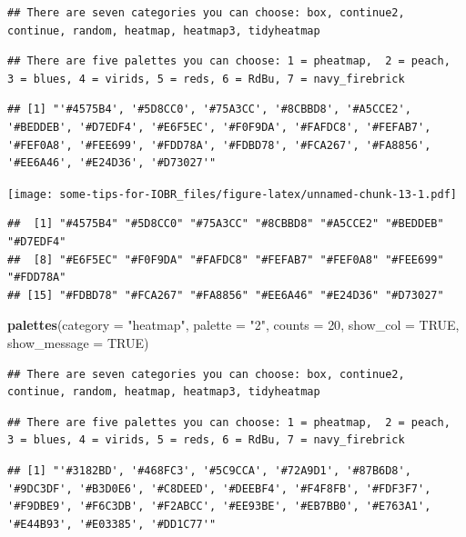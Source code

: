 \documentclass[
  12pt,
]{book}
\newenvironment{Shaded}{\begin{snugshade}}{\end{snugshade}}
\newcommand{\AttributeTok}[1]{\textcolor[rgb]{0.13,0.29,0.53}{#1}}
\newcommand{\ConstantTok}[1]{\textcolor[rgb]{0.56,0.35,0.01}{#1}}
\newcommand{\DecValTok}[1]{\textcolor[rgb]{0.00,0.00,0.81}{#1}}
\newcommand{\FunctionTok}[1]{\textcolor[rgb]{0.13,0.29,0.53}{\textbf{#1}}}
\newcommand{\NormalTok}[1]{#1}
\newcommand{\StringTok}[1]{\textcolor[rgb]{0.31,0.60,0.02}{#1}}
\begin{document}
\begin{verbatim}
## There are seven categories you can choose: box, continue2, continue, random, heatmap, heatmap3, tidyheatmap
\end{verbatim}

\begin{verbatim}
## There are five palettes you can choose: 1 = pheatmap,  2 = peach,  3 = blues, 4 = virids, 5 = reds, 6 = RdBu, 7 = navy_firebrick
\end{verbatim}

\begin{verbatim}
## [1] "'#4575B4', '#5D8CC0', '#75A3CC', '#8CBBD8', '#A5CCE2', '#BEDDEB', '#D7EDF4', '#E6F5EC', '#F0F9DA', '#FAFDC8', '#FEFAB7', '#FEF0A8', '#FEE699', '#FDD78A', '#FDBD78', '#FCA267', '#FA8856', '#EE6A46', '#E24D36', '#D73027'"
\end{verbatim}

\texttt{[image: some-tips-for-IOBR\_files/figure-latex/unnamed-chunk-13-1.pdf]}

\begin{verbatim}
##  [1] "#4575B4" "#5D8CC0" "#75A3CC" "#8CBBD8" "#A5CCE2" "#BEDDEB" "#D7EDF4"
##  [8] "#E6F5EC" "#F0F9DA" "#FAFDC8" "#FEFAB7" "#FEF0A8" "#FEE699" "#FDD78A"
## [15] "#FDBD78" "#FCA267" "#FA8856" "#EE6A46" "#E24D36" "#D73027"
\end{verbatim}

\begin{Shaded}
\begin{Highlighting}[]
\FunctionTok{palettes}\NormalTok{(}\AttributeTok{category =} \StringTok{"heatmap"}\NormalTok{, }\AttributeTok{palette =} \StringTok{"2"}\NormalTok{, }\AttributeTok{counts =} \DecValTok{20}\NormalTok{, }\AttributeTok{show\_col =} \ConstantTok{TRUE}\NormalTok{, }\AttributeTok{show\_message =} \ConstantTok{TRUE}\NormalTok{)}
\end{Highlighting}
\end{Shaded}

\begin{verbatim}
## There are seven categories you can choose: box, continue2, continue, random, heatmap, heatmap3, tidyheatmap
\end{verbatim}

\begin{verbatim}
## There are five palettes you can choose: 1 = pheatmap,  2 = peach,  3 = blues, 4 = virids, 5 = reds, 6 = RdBu, 7 = navy_firebrick
\end{verbatim}

\begin{verbatim}
## [1] "'#3182BD', '#468FC3', '#5C9CCA', '#72A9D1', '#87B6D8', '#9DC3DF', '#B3D0E6', '#C8DEED', '#DEEBF4', '#F4F8FB', '#FDF3F7', '#F9DBE9', '#F6C3DB', '#F2ABCC', '#EE93BE', '#EB7BB0', '#E763A1', '#E44B93', '#E03385', '#DD1C77'"
\end{verbatim}
\end{document}
